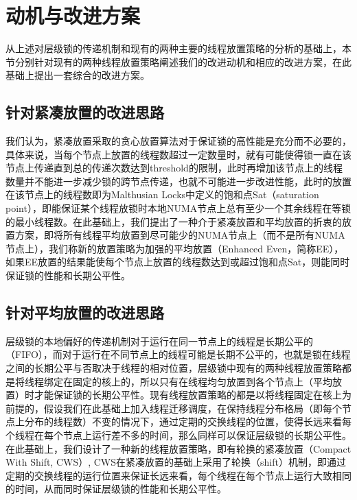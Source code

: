 \section{动机与改进方案}
从上述对层级锁的传递机制和现有的两种主要的线程放置策略的分析的基础上，本节分别针对现有的两种线程放置策略阐述我们的改进动机和相应的改进方案，在此基础上提出一套综合的改进方案。

\subsection{针对紧凑放置的改进思路}
我们认为，紧凑放置采取的贪心放置算法对于保证锁的高性能是充分而不必要的，具体来说，当每个节点上放置的线程数超过一定数量时，就有可能使得锁一直在该节点上传递直到总的传递次数达到threshold的限制，此时再增加该节点上的线程数量并不能进一步减少锁的跨节点传递，也就不可能进一步改进性能，此时的放置在该节点上的线程数即为Malthusian Locks\cite{dice2017malthusian}中定义的饱和点Sat（saturation point），即能保证某个线程放锁时本地NUMA节点上总有至少一个其余线程在等锁的最小线程数。在此基础上，我们提出了一种介于紧凑放置和平均放置的折衷的放置方案，即将所有线程平均放置到尽可能少的NUMA节点上（而不是所有NUMA节点上），我们称新的放置策略为加强的平均放置（Enhanced Even，简称EE），如果EE放置的结果能使每个节点上放置的线程数达到或超过饱和点Sat，则能同时保证锁的性能和长期公平性。

\subsection{针对平均放置的改进思路}
层级锁的本地偏好的传递机制对于运行在同一节点上的线程是长期公平的（FIFO），而对于运行在不同节点上的线程可能是长期不公平的，也就是锁在线程之间的长期公平与否取决于线程的相对位置，层级锁中现有的两种线程放置策略都是将线程绑定在固定的核上的，所以只有在线程均匀放置到各个节点上（平均放置）时才能保证锁的长期公平性。现有线程放置策略的都是以将线程固定在核上为前提的，假设我们在此基础上加入线程迁移调度，在保持线程分布格局（即每个节点上分布的线程数）不变的情况下，通过定期的交换线程的位置，使得长远来看每个线程在每个节点上运行差不多的时间，那么同样可以保证层级锁的长期公平性。在此基础上，我们设计了一种新的线程放置策略，即有轮换的紧凑放置（Compact With Shift, CWS）, CWS在紧凑放置的基础上采用了轮换（shift）机制，即通过定期的交换线程的运行位置来保证长远来看，每个线程在每个节点上运行大致相同的时间，从而同时保证层级锁的性能和长期公平性。

